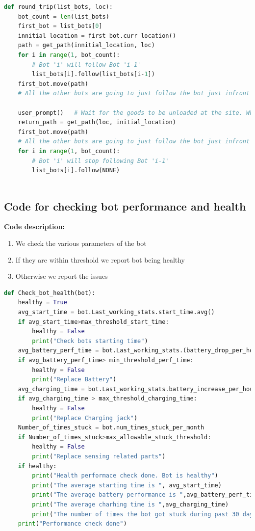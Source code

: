 \documentclass{article}
\begin{document}
\begin{lstlisting}[language=Python, caption=Round Trip of bot-Part 2]
def round_trip(list_bots, loc):
	bot_count = len(list_bots)
	first_bot = list_bots[0]
	innitial_location = first_bot.curr_location()
	path = get_path(innitial_location, loc)
	for i in range(1, bot_count):
		# Bot 'i' will follow Bot 'i-1'
		list_bots[i].follow(list_bots[i-1])		
	first_bot.move(path)
	# All the other bots are going to just follow the bot just infront of it so all the bots will reach the destination.

	user_prompt()	# Wait for the goods to be unloaded at the site. When the bots are free to go the shop owner will press OK on prompt.
	return_path = get_path(loc, initial_location)
	first_bot.move(path)
	# All the other bots are going to just follow the bot just infront of it so all the bots will reach the destination.
	for i in range(1, bot_count):
		# Bot 'i' will stop following Bot 'i-1'
		list_bots[i].follow(NONE)
		
\end{lstlisting}
\subsection{Code for checking bot performance and health}
\label{code:f}
\textbf{Code description: }
\begin{enumerate}
\item We check the various parameters of the bot
\item If they are within threshold we report bot being healthy
\item Otherwise we report the issues
\end{enumerate}
\begin{lstlisting}[language=Python, caption=Checking bot health]
def Check_bot_health(bot):
    healthy = True
    avg_start_time = bot.Last_working_stats.start_time.avg()
    if avg_start_time>max_threshold_start_time:
        healthy = False
        print("Check bots starting time")
    avg_battery_perf_time = bot.Last_working_stats.(battery_drop_per_hour).avg()
    if avg_battery_perf_time> min_threshold_perf_time:
        healthy = False
        print("Replace Battery")
    avg_charging_time = bot.Last_working_stats.battery_increase_per_hour_per_watt.avg()
    if avg_charging_time > max_threshold_charging_time:
        healthy = False
        print("Replace Charging jack")
    Number_of_times_stuck = bot.num_times_stuck_per_month
    if Number_of_times_stuck>max_allowable_stuck_threshold:
        healthy = False
        print("Replace sensing related parts")
    if healthy:
        print("Health performace check done. Bot is healthy")
        print("The average starting time is ", avg_start_time)
        print("The average battery performance is ",avg_battery_perf_time)
        print("The average charhing time is ",avg_charging_time)
        print("The number of times the bot got stuck during past 30 days is",Number_of_times_stuck)
    print("Performance check done")

\end{lstlisting}
\end{document}
